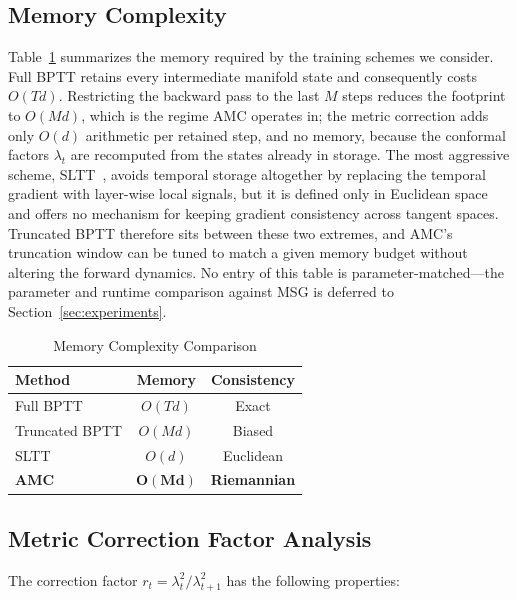 \documentclass[a4paper,fleqn]{cas-dc}
\begin{document}
\subsection{Memory Complexity}

Table~\ref{tab:memory} summarizes the memory required by the training schemes we consider. Full BPTT retains every intermediate manifold state and consequently costs $O(Td)$. Restricting the backward pass to the last $M$ steps reduces the footprint to $O(Md)$, which is the regime AMC operates in; the metric correction adds only $O(d)$ arithmetic per retained step, and no memory, because the conformal factors $\lambda_t$ are recomputed from the states already in storage. The most aggressive scheme, SLTT~\citep{Meng23SLTT}, avoids temporal storage altogether by replacing the temporal gradient with layer-wise local signals, but it is defined only in Euclidean space and offers no mechanism for keeping gradient consistency across tangent spaces. Truncated BPTT therefore sits between these two extremes, and AMC's truncation window can be tuned to match a given memory budget without altering the forward dynamics. No entry of this table is parameter-matched---the parameter and runtime comparison against MSG is deferred to Section~\ref{sec:experiments}.

\begin{table}[htbp]
\caption{Memory Complexity Comparison}
\label{tab:memory}
\centering
\footnotesize
\begin{tabular}{@{}lcc@{}}
\toprule
\textbf{Method} & \textbf{Memory} & \textbf{Consistency} \\
\midrule
Full BPTT & $O(Td)$ & Exact \\
Truncated BPTT & $O(Md)$ & Biased \\
SLTT~\citep{Meng23SLTT} & $O(d)$ & Euclidean \\
\textbf{AMC} & $\mathbf{O(Md)}$ & \textbf{Riemannian} \\
\bottomrule
\end{tabular}
\end{table}

\subsection{Metric Correction Factor Analysis}

The correction factor $r_t = \lambda_t^2 / \lambda_{t+1}^2$ has the following properties:
\end{document}
